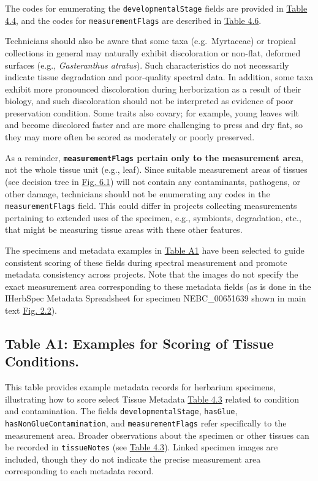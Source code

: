 \documentclass[
  letterpaper,
  DIV=11,
  numbers=noendperiod]{scrreprt}
\begin{document}
The codes for enumerating the \texttt{developmentalStage} fields are
provided in \hyperref[tbl-4-4]{Table 4.4}, and the codes for
\texttt{measurementFlags} are described in \hyperref[tbl-4-6]{Table
4.6}.

Technicians should also be aware that some taxa (e.g.~Myrtaceae) or
tropical collections in general may naturally exhibit discoloration or
non-flat, deformed surfaces (e.g., \emph{Gasteranthus atratus}). Such
characteristics do not necessarily indicate tissue degradation and
poor-quality spectral data. In addition, some taxa exhibit more
pronounced discoloration during herborization as a result of their
biology, and such discoloration should not be interpreted as evidence of
poor preservation condition. Some traits also covary; for example, young
leaves wilt and become discolored faster and are more challenging to
press and dry flat, so they may more often be scored as moderately or
poorly preserved.

As a reminder, \textbf{\texttt{measurementFlags} pertain only to the
measurement area}, not the whole tissue unit (e.g., leaf). Since
suitable measurement areas of tissues (see decision tree in
\hyperref[part-6-selecting-tissues-for-spectral-measurement]{Fig. 6.1})
will not contain any contaminants, pathogens, or other damage,
technicians should not be enumerating any codes in the
\texttt{measurementFlags} field. This could differ in projects
collecting measurements pertaining to extended uses of the specimen,
e.g., symbionts, degradation, etc., that might be measuring tissue areas
with these other features.

The specimens and metadata examples in \hyperref[tbl-a-1]{Table A1} have
been selected to guide consistent scoring of these fields during
spectral measurement and promote metadata consistency across projects.
Note that the images do not specify the exact measurement area
corresponding to these metadata fields (as is done in the IHerbSpec
Metadata Spreadsheet for specimen NEBC\_00651639 shown in main text
\hyperref[part-2-measurement-and-metadata-workflow]{Fig. 2.2}).

\subsection{Table A1: Examples for Scoring of Tissue
Conditions.}\label{tbl-a-1}

This table provides example metadata records for herbarium specimens,
illustrating how to score select Tissue Metadata
\hyperref[tbl-4-3]{Table 4.3} related to condition and contamination.
The fields \texttt{developmentalStage}, \texttt{hasGlue},
\texttt{hasNonGlueContamination}, and \texttt{measurementFlags} refer
specifically to the measurement area. Broader observations about the
specimen or other tissues can be recorded in \texttt{tissueNotes} (see
\hyperref[tbl-4-3]{Table 4.3}). Linked specimen images are included,
though they do not indicate the precise measurement area corresponding
to each metadata record.
\end{document}
